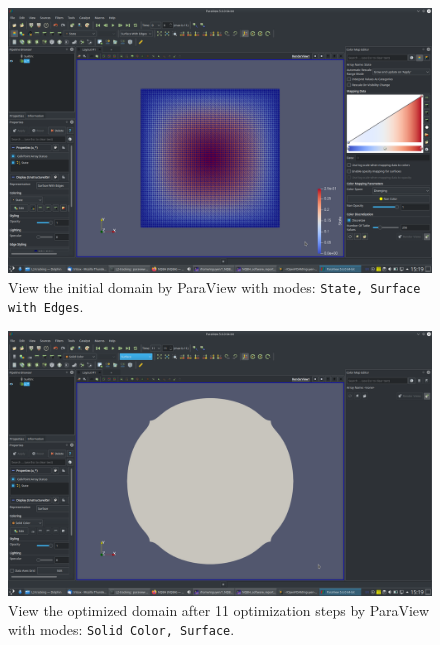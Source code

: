 \documentclass[onsided]{book}
\numberwithin{equation}{section}
\begin{document}
\begin{enumerate}
\begin{enumerate}
        \begin{figure}[H]
            \centering
            \includegraphics[height=0.44\textheight]{L2-tracking_initial_domain_State_Surface_with_Edges}
            \caption{View the initial domain by ParaView with modes: \texttt{State, Surface with Edges}.}
        \end{figure}

        \begin{figure}[H]
            \centering
            \includegraphics[height=0.44\textheight]{L2-tracking_optimized_domain_after_11_steps_Solid_Color_Surface}
            \caption{View the optimized domain after 11 optimization steps by ParaView with modes: \texttt{Solid Color, Surface}.}
        \end{figure}
        

\end{enumerate}
\end{enumerate}
\end{document}
